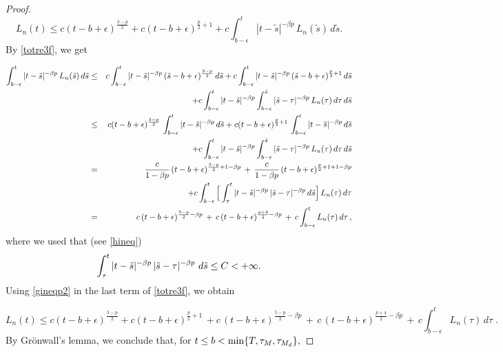 \documentclass[10pt,a4paper]{amsart}
\begin{document}
\begin{proof}
\begin{equation}\label{totre3f} L_n(t) \leq c (t-b+\epsilon)^{\frac{3-p}{2}} + c (t-b+\epsilon)^{\frac{p}{2}+1} + c\int_{b-\epsilon}^t|t-\tilde{s}|^{-\beta p} \,L_n(\tilde{s})\,d\tilde{s}.\end{equation}
By \eqref{totre3f}, we get %

\begin{eqnarray}
\int_{b-\epsilon}^t|t-\tilde{s}|^{-\beta p}\, L_n(\tilde{s})\,d\tilde{s}
&\leq&
c \int_{b-\epsilon}^t |t-\Tilde{s}|^{-\beta p}\, (\tilde{s}-b+\epsilon)^{\frac{3-p}{2}}\,d\tilde{s} 
+ c \int_{b-\epsilon}^t |t-\Tilde{s}|^{-\beta p} \, (\tilde{s}-b+\epsilon)^{\frac{p}{2}+1}\,d\tilde{s} 
\nonumber\\
& & + c \int_{b-\epsilon}^t |t-\Tilde{s}|^{-\beta p} \int_{b-\epsilon}^{\tilde{s}} |\tilde{s}-\tau|^{-\beta p} \,  L_n(\tau) \, d\tau \, d\tilde{s}
\nonumber\\
&\leq&
c (t-b+\epsilon)^{\frac{3-p}{2}}\, \int_{b-\epsilon}^t |t-\Tilde{s}|^{-\beta p}\, d\tilde{s} 
+ c  (t-b+\epsilon)^{\frac{p}{2}+1}\,\int_{b-\epsilon}^t |t-\Tilde{s}|^{-\beta p} \,d\tilde{s} 
\nonumber\\
& & + c \int_{b-\epsilon}^t |t-\Tilde{s}|^{-\beta p} \int_{b-\epsilon}^{\tilde{s}}  |\tilde{s}-\tau|^{-\beta p} \, L_n(\tau) \, d\tau \, d\tilde{s}
\nonumber\\
&=&
\frac{c}{1-\beta p} \, (t-b+\epsilon)^{\frac{3-p}{2}+1-\beta p}
\,+\,
\frac{c}{1-\beta p} \, (t-b+\epsilon)^{\frac{p}{2}+1+1-\beta p}
\nonumber\\
& & + c \int_{b-\epsilon}^t \Big[ \int_{\tau}^t |t-\Tilde{s}|^{-\beta p} \, |\tilde{s}-\tau|^{-\beta p} \, d\tilde{s} \Big]\, L_n(\tau) \, d\tau
\nonumber\\
&=&
c\, (t-b+\epsilon)^{\frac{5-p}{2}-\beta p}
\,+\,
c \, (t-b+\epsilon)^{\frac{p+4}{2}-\beta p}
\, +\, c \int_{b-\epsilon}^t L_n(\tau) \, d\tau \,,\label{gineqp2}
\end{eqnarray}
where we used that (see \eqref{hineq})
$$
\int_\tau^t|t-\Tilde{s}|^{-\beta p} \, |\tilde{s}-\tau|^{-\beta p} \,  \,d\tilde{s} \leq C < +\infty.
$$
Using \eqref{gineqp2} in the last term of \eqref{totre3f}, we obtain

\begin{equation}
L_n(t) \leq c (t-b+\epsilon)^{\frac{3-p}{2}} + c (t-b+\epsilon)^{\frac{p}{2}+1}\,+ c\, (t-b+\epsilon)^{\frac{5-p}{2}-\beta p}
\,+\,c \, (t-b+\epsilon)^{\frac{p+4}{2}-\beta p}
\, +\, c \int_{b-\epsilon}^t L_n(\tau) \, d\tau\;.
\end{equation}
By Gr\"onwall's lemma, we conclude that, for $t\leq b < \min\{T,\tau_M,\tau_{M_{\rm d}}\}, $


\end{proof}
\end{document}
